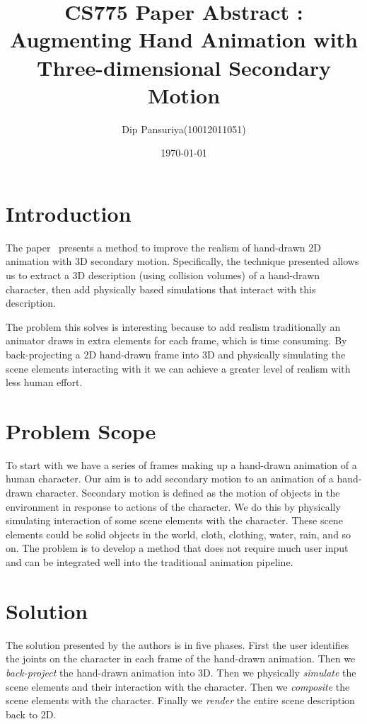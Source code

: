 \documentclass[a4paper,9pt]{article}
\title{CS775 Paper Abstract : Augmenting Hand Animation with Three-dimensional Secondary Motion}
\author{Dip Pansuriya(10012011051)}
\date{\today}
\begin{document}
\maketitle

\section{Introduction}
The paper~\cite{Aug10} presents a method to improve the realism of hand-drawn 2D animation with 3D secondary motion. Specifically, the technique presented allows us to extract a 3D description (using collision volumes) of a hand-drawn character, then add physically based simulations that interact with this description.

The problem this solves is interesting because to add realism traditionally an animator draws in extra elements for each frame, which is time consuming. By back-projecting a 2D hand-drawn frame into 3D and physically simulating the scene elements interacting with it we can achieve a greater level of realism with less human effort.

\section{Problem Scope}
To start with we have a series of frames making up a hand-drawn animation of a human character. Our aim is to add secondary motion to an animation of a hand-drawn character. Secondary motion is defined as the motion of objects in the environment in response to actions of the character. We do this by physically simulating interaction of some scene elements with the character. These scene elements could be solid objects in the world, cloth, clothing, water, rain, and so on. The problem is to develop a method that does not require much user input and can be integrated well into the traditional animation pipeline.

\section{Solution}
The solution presented by the authors is in five phases. First the user identifies the joints on the character in each frame of the hand-drawn animation. Then we \textit{back-project} the hand-drawn animation into 3D. Then we physically \textit{simulate} the scene elements and their interaction with the character. Then we \textit{composite} the scene elements with the character. Finally we \textit{render} the entire scene description back to 2D.
\end{document}
